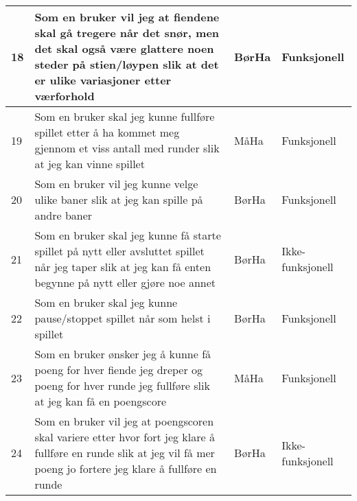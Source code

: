 \documentclass[norsk,a4paper]{article}
\begin{document}
\begin{center}
\begin{tabular}{|m{} | m{} | m{2cm} | m{3cm} |}
    18 & Som en bruker vil jeg at fiendene skal gå tregere når det snør, men det skal også være glattere noen steder på stien/løypen slik at det er ulike variasjoner etter værforhold & BørHa & Funksjonell \\ \hline
    
    19 & Som en bruker skal jeg kunne fullføre spillet etter å ha kommet meg gjennom et viss antall med runder slik at jeg kan vinne spillet & MåHa & Funksjonell \\ \hline
    
    20 & Som en bruker vil jeg kunne velge ulike baner slik at jeg kan spille på andre baner & BørHa & Funksjonell \\ \hline
    
    21 & Som en bruker skal jeg kunne få starte spillet på nytt eller avsluttet spillet når jeg taper slik at jeg kan få enten begynne på nytt eller gjøre noe annet  & BørHa & Ikke-funksjonell \\ \hline
       
   22 & Som en bruker skal jeg kunne pause/stoppet spillet når som helst i spillet & BørHa & Funksjonell \\ \hline
   
   23 & Som en bruker ønsker jeg å kunne få poeng for hver fiende jeg dreper og poeng for hver runde jeg fullføre slik at jeg kan få en poengscore  & MåHa & Funksjonell 
   \\ \hline
   
   24 & Som en bruker vil jeg at poengscoren skal variere etter hvor fort jeg klare å fullføre en runde slik at jeg vil få mer poeng jo fortere jeg klare å fullføre en runde & BørHa & Ikke-funksjonell \\ \hline 
    
\end{tabular}
\end{center} 
\end{document}
